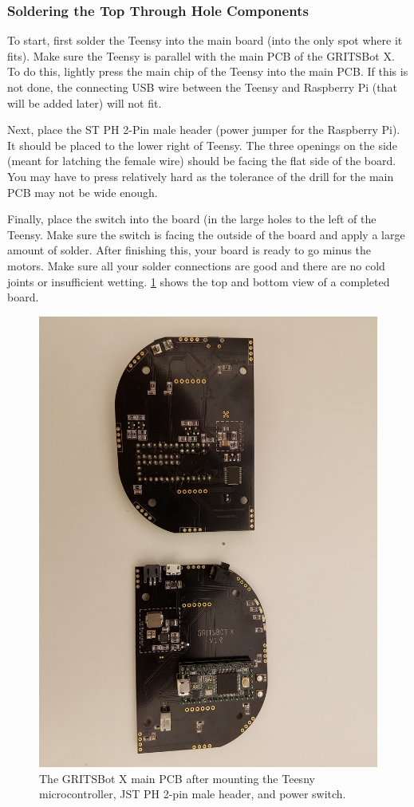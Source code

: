 \subsubsection{Soldering the Top Through Hole Components}
\label{sec:solderTopComponents}

To start, first solder the Teensy into the main board (into the only spot where it fits). Make sure the Teensy is parallel with the main PCB of the GRITSBot X. To do this, lightly press the main chip of the Teensy into the main PCB. If this is not done, the connecting USB wire between the Teensy and Raspberry Pi (that will be added later) will not fit.

Next, place the ST PH 2-Pin male header (power jumper for the Raspberry Pi). It should be placed to the lower right of Teensy. The three openings on the side (meant for latching the female wire) should be facing the flat side of the board. You may have to press relatively hard as the tolerance of the drill for the main PCB may not be wide enough.

Finally, place the switch into the board (in the large holes to the left of the Teensy. Make sure the switch is facing the outside of the board and apply a large amount of solder. After finishing this, your board is ready to go minus the motors. Make sure all your solder connections are good and there are no cold joints or insufficient wetting. \cref{fig:mainPCBNoMotors} shows the top and bottom view of a completed board.

\begin{figure}[h!]
\centering
\includegraphics[width=0.65\columnwidth, keepaspectratio]{./figs/20180912_114341.jpg}
\caption{The GRITSBot X main PCB after mounting the Teesny microcontroller, JST PH 2-pin male header, and power switch.}
\label{fig:mainPCBNoMotors}
\end{figure}

